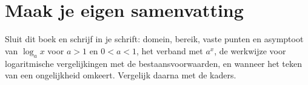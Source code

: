 
\begin{oefeningen}






\end{oefeningen}


\ifzelfstudie
\section*{Maak je eigen samenvatting}
Sluit dit boek en schrijf in je schrift: domein, bereik, vaste punten en asymptoot van $\log_a x$ voor $a > 1$ en $0 < a < 1$, het verband met $a^x$, de werkwijze voor logaritmische vergelijkingen met de bestaansvoorwaarden, en wanneer het teken van een ongelijkheid omkeert. Vergelijk daarna met de kaders.
\fi
